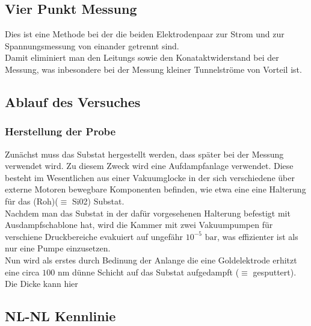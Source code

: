 \documentclass[twoside,        %
               BCOR12mm,       %
               english,ngerman, %
               fleqn,headsepline=false,footsepline=false
              ]{MFPREPORT}
\begin{document}
\subsection{Vier Punkt Messung}

Dies ist eine Methode bei der die beiden Elektrodenpaar zur Strom und zur Spannungsmessung von einander getrennt sind.
\\
Damit eliminiert man den Leitungs sowie den Konataktwiderstand bei der Messung, was inbesondere bei der Messung kleiner Tunnelströme von Vorteil ist.


\subsection{Ablauf des Versuches}

\subsubsection{Herstellung der Probe}

Zunächst muss das Substat hergestellt werden, dass später bei der Messung verwendet wird.
Zu diesem Zweck wird eine Aufdampfanlage verwendet. 
Diese besteht im Wesentlichen aus einer Vakuumglocke in der sich verschiedene über externe Motoren bewegbare Komponenten befinden, wie etwa eine eine Halterung für das (Roh)($\equiv$ Si02) Substat.
\\
Nachdem man das Substat in der dafür vorgesehenen Halterung befestigt mit Ausdampfschablone hat, wird die Kammer mit zwei Vakuumpumpen für verschiene Druckbereiche evakuiert auf ungefähr $10^{-5} \text{ bar}$, was effizienter ist als nur eine Pumpe einzusetzen.
\\
Nun wird als erstes durch Bedinung der Anlange die eine Goldelektrode erhitzt eine circa $100 \text{ nm}$ dünne Schicht auf das Substat aufgedampft ($\equiv$ gesputtert).
Die Dicke kann hier
















\subsection{NL-NL Kennlinie}
\end{document}
